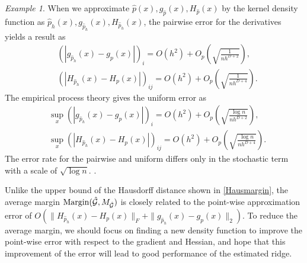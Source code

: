 \documentclass[aos,preprint]{imsart}
\theoremstyle{remark}
\newtheorem*{example}{Example}
\begin{document}
\begin{example}
When we approximate $\hat{p}(x), g_{\hat{p}}(x), H_{\hat{p}}(x)$ by the kernel density function as $\hat{p}_h(x), g_{\hat{p}_h}(x), H_{\hat{p}_h}(x)$, %
the pairwise error for the derivatives yields a result as
\[
\begin{aligned}
& ( |g_{\hat{p}_h}(x)-g_p(x)|)_i = O(h^2) + O_p(\sqrt{\frac{1}{{{n h^{D+2}}}}}),\\
& ( |H_{\hat{p}_h}(x)-H_p(x)| )_{ij} = O(h^2) + O_p(\sqrt{\frac{1}{{{n h^{D+4}}}}}).
\end{aligned}
\]
The empirical process theory gives the uniform error as
\[
\begin{aligned}
& \sup_x( |g_{\hat{p}_h}(x)-g_p(x)|)_i = O(h^2) + O_p(\sqrt{\frac{\log n}{{{n h^{D+2}}}}}),\\
& \sup_x( |H_{\hat{p}_h}(x)-H_p(x)| )_{ij} = O(h^2) + O_p(\sqrt{\frac{\log n}{{{n h^{D+4}}}}}).
\end{aligned}
\]
The error rate for the pairwise and uniform differs only in the stochastic term with a scale of $\sqrt{\log n}$. \cite{chen2017tutorial,JMLR:v17:ariascastro16a, genovese2014nonparametric}.
\end{example}

Unlike the upper bound of the Hausdorff distance shown in \eqref{Hausmargin}, the average margin ${\rm Margin}(\hat {\mathcal G}, M_{\hat{\cal G}})$ is closely related to the point-wise approximation error of $O (\|H_{\hat{p}_h}(x)-H_p(x)\|_F+\|g_{\hat{p}_h}(x)-g_p(x)\|_2)$. To reduce the average margin, we should focus on finding a new density function to improve the point-wise error with respect to the gradient and Hessian, and hope that this improvement of the error will lead to good performance of the estimated ridge.
\end{document}
